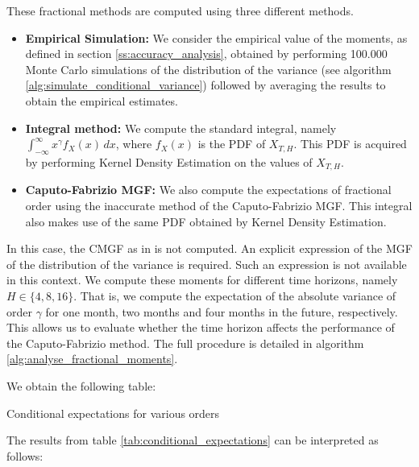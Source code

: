 These fractional methods are computed using three different methods. 
\begin{itemize}
\item \textbf{Empirical Simulation: } We consider the empirical value of the moments, as defined in section \ref{ss:accuracy_analysis}, obtained by performing 100.000 Monte Carlo simulations of the distribution of the variance (see algorithm \ref{alg:simulate_conditional_variance}) followed by averaging the results to obtain the empirical estimates.
\item \textbf{Integral method: } We compute the standard integral, namely \(\int_{-\infty}^{\infty} x^\gamma f_X(x) \, dx\), where \(f_X(x)\) is the PDF of \(X_{T,H}\). This PDF is acquired by performing Kernel Density Estimation on the values of \(X_{T,H}\).
\item \textbf{Caputo-Fabrizio MGF: } We also compute the expectations of fractional order using the inaccurate method of the Caputo-Fabrizio MGF. This integral also makes use of the same PDF obtained by Kernel Density Estimation.
\end{itemize} 

In this case, the CMGF as in \citet{hansen2024} is not computed. An explicit expression of the MGF of the distribution of the variance is required. Such an expression is not available in this context. We compute these moments for different time horizons, namely \(H \in \{4, 8, 16\}\). That is, we compute the expectation of the absolute variance of order \(\gamma\) for one month, two months and four months in the future, respectively. This allows us to evaluate whether the time horizon affects the performance of the Caputo-Fabrizio method. The full procedure is detailed in algorithm \ref{alg:analyse_fractional_moments}. 

We obtain the following table:


\begin{table}[H]
    \centering

\caption{Conditional expectations for various orders} 
\label{tab:conditional_expectations}
\end{table}
The results from table \ref{tab:conditional_expectations} can be interpreted as follows:

